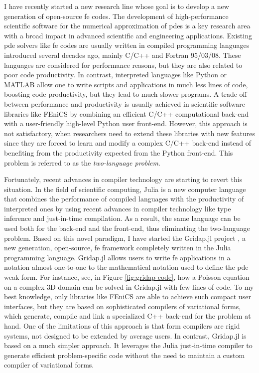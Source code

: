 \documentclass{article}
\begin{document}
I have recently started a new research line whose goal is to develop a new generation of open-source \ac{fe} codes.  The development of high-performance scientific software for the numerical approximation of \acp{pde} is a key research area with a broad impact in advanced scientific and engineering applications. Existing \ac{pde} solvers like \ac{fe} codes are usually written in compiled programming languages introduced several decades ago, mainly C/C++ and Fortran 95/03/08. These languages are considered for performance reasons, but they are also related to poor code productivity. In contrast, interpreted languages like Python or MATLAB allow one to write scripts and applications in much less lines of code, boosting code productivity, but they lead to much slower programs. A trade-off between performance and productivity is usually achieved in scientific software libraries like FEniCS by combining an efficient C/C++ computational back-end with a user-friendly high-level Python user front-end. However, this approach is not satisfactory, when researchers need to extend these libraries with new features since they are forced to learn and modify a complex C/C++ back-end instead of benefiting from the productivity expected from the Python front-end. This problem is referred to as the \emph{two-language problem}.

Fortunately, recent advances in compiler technology are starting to revert this situation. In the field of scientific computing, Julia is a new computer language that combines the performance of compiled languages with the productivity of interpreted ones by using recent advances in compiler technology like type inference and just-in-time compilation. As a result, the same language can be used both for the back-end and the front-end, thus eliminating the two-language problem. Based on this novel paradigm, I have started the Gridap.jl project \cite{badia_2020b}, a new generation, open-source, \ac{fe} framework completely written in the Julia programming language. Gridap.jl allows users to write \ac{fe} applications in a notation almost one-to-one to the mathematical notation used to define the \ac{pde} weak form. For instance, see, in Figure \ref{fig:gridap-code}, how a Poisson equation on a complex 3D domain can be solved in Gridap.jl with few lines of code. To my best knowledge, only libraries like FEniCS are able to achieve such compact user interfaces, but they are based on sophisticated compilers of variational forms, which generate, compile and link a specialized C++ back-end for the problem at hand. One of the limitations of this approach is that form compilers are rigid systems, not designed to be extended by average users. In contrast, Gridap.jl is based on a much simpler approach. It leverages the Julia just-in-time compiler to generate efficient problem-specific code without the need to maintain a custom compiler of variational forms.
\end{document}
